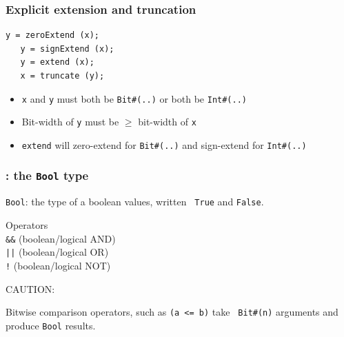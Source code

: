 \begin{frame}[fragile]
\frametitle{Explicit extension and truncation}

\footnotesize

\begin{Verbatim}[frame=single]
   y = zeroExtend (x);
   y = signExtend (x);
   y = extend (x);
   x = truncate (y);
\end{Verbatim}

\vspace{2ex}

\begin{itemize}
 \item {\tt x} and {\tt y} must both be \verb|Bit#(..)| or both be \verb|Int#(..)|

 \item Bit-width of {\tt y} must be $\geq$ bit-width of {\tt x}

 \item \verb|extend| will zero-extend for \verb|Bit#(..)| and sign-extend for \verb|Int#(..)|
\end{itemize}

\end{frame}


\begin{frame}[fragile]
\frametitle{{\BSV}: the {\tt Bool} type}

\footnotesize

\verb|Bool|: the type of a boolean values, written {\tt
True} and {\tt False}.

\vspace{1ex}

Operators \\
\hmmmm \verb|&&| (boolean/logical AND) \\
\hmmmm \verb'||' (boolean/logical OR)  \\
\hmmmm \verb|!| (boolean/logical NOT)  \\

\vspace{10ex}

CAUTION: 

\vspace{2ex}

Bitwise comparison operators, such as {\tt (a <= b)} take {\tt
Bit\#(n)} arguments and produce {\tt Bool} results.


\end{frame}

